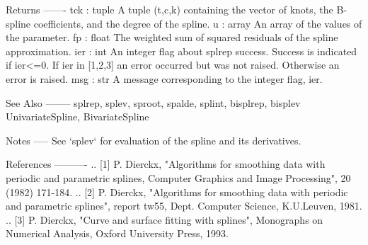 \begin{DoxyVerb}
Returns
-------
tck : tuple
    A tuple (t,c,k) containing the vector of knots, the B-spline
    coefficients, and the degree of the spline.
u : array
    An array of the values of the parameter.
fp : float
    The weighted sum of squared residuals of the spline approximation.
ier : int
    An integer flag about splrep success.  Success is indicated
    if ier<=0. If ier in [1,2,3] an error occurred but was not raised.
    Otherwise an error is raised.
msg : str
    A message corresponding to the integer flag, ier.

See Also
--------
splrep, splev, sproot, spalde, splint,
bisplrep, bisplev
UnivariateSpline, BivariateSpline

Notes
-----
See `splev` for evaluation of the spline and its derivatives.

References
----------
.. [1] P. Dierckx, "Algorithms for smoothing data with periodic and
    parametric splines, Computer Graphics and Image Processing",
    20 (1982) 171-184.
.. [2] P. Dierckx, "Algorithms for smoothing data with periodic and
    parametric splines", report tw55, Dept. Computer Science,
    K.U.Leuven, 1981.
.. [3] P. Dierckx, "Curve and surface fitting with splines", Monographs on
    Numerical Analysis, Oxford University Press, 1993.\end{DoxyVerb}
 \hypertarget{namespacescipy_1_1interpolate_1_1fitpack_a2423e02d061f11d96122b40b2919d3b8}{}
